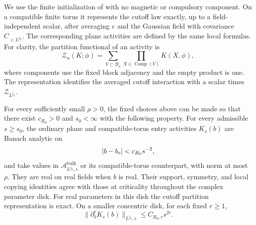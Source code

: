 We use the finite initialization of \cite{F} with no magnetic or
compulsory component.  On a compatible finite torus it represents the
cutoff law exactly, up to a field-independent scalar, after averaging
$e$ and the Gaussian field with covariance $C_{<L^{j_0}}$.  The
corresponding plane activities are defined by the same local formulas.
For clarity, the partition functional of an activity is
\[
 \mathcal Z_u(K;\phi)=\sum_{V\subset\mathcal B_u}
                         \prod_{X\in\operatorname{Comp}(V)}K(X,\phi),
\]
where components use the fixed block adjacency and the empty product
is one.  The representation identifies the averaged cutoff interaction
with a scalar times $\mathcal Z_{L^{j_0}}$.

\begin{proposition}\label{prop:entry}
For every sufficiently small $\rho>0$, the fixed choices above can be
made so that there exist $c_{R_0}>0$ and $s_0<\infty$ with the following
property.  For every admissible $s\ge s_0$, the ordinary plane and
compatible-torus entry activities $K_s(b)$ are Banach analytic on
\begin{equation}\label{eq:entry-parameter-disk}
                         |b-b_c|<c_{R_0}s^{-2},
\end{equation}
and take values in $\mathscr A^{\mathrm{bulk}}_{L^{j_0},s}$ or its
compatible-torus counterpart, with norm at most $\rho$.
They are real on real fields when $b$ is real.  Their support,
symmetry, and local copying identities agree with those at criticality
throughout the complex parameter disk.
For real parameters in this disk the cutoff partition representation
is exact.  On a smaller concentric disk, for each fixed $r\ge1$,
\begin{equation}\label{eq:entry-cauchy}
                \|\partial_b^rK_s(b)\|_{L^{j_0},s}
                              \le C_{R_0,r}s^{2r}.
\end{equation}
\end{proposition}

